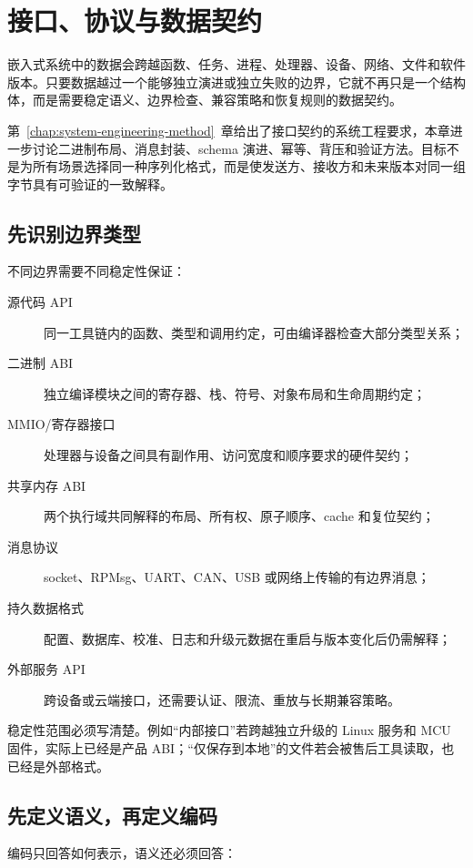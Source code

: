 \chapter{接口、协议与数据契约}
\label{chap:interface-protocol-data-contracts}

嵌入式系统中的数据会跨越函数、任务、进程、处理器、设备、网络、文件和软件版本。只要数据越过一个能够独立演进或独立失败的边界，它就不再只是一个结构体，而是需要稳定语义、边界检查、兼容策略和恢复规则的数据契约。

第~\ref{chap:system-engineering-method}~章给出了接口契约的系统工程要求，本章进一步讨论二进制布局、消息封装、schema 演进、幂等、背压和验证方法。目标不是为所有场景选择同一种序列化格式，而是使发送方、接收方和未来版本对同一组字节具有可验证的一致解释。

\section{先识别边界类型}

不同边界需要不同稳定性保证：

\begin{description}
  \item[源代码 API] 同一工具链内的函数、类型和调用约定，可由编译器检查大部分类型关系；
  \item[二进制 ABI] 独立编译模块之间的寄存器、栈、符号、对象布局和生命周期约定；
  \item[MMIO/寄存器接口] 处理器与设备之间具有副作用、访问宽度和顺序要求的硬件契约；
  \item[共享内存 ABI] 两个执行域共同解释的布局、所有权、原子顺序、cache 和复位契约；
  \item[消息协议] socket、RPMsg、UART、CAN、USB 或网络上传输的有边界消息；
  \item[持久数据格式] 配置、数据库、校准、日志和升级元数据在重启与版本变化后仍需解释；
  \item[外部服务 API] 跨设备或云端接口，还需要认证、限流、重放与长期兼容策略。
\end{description}

稳定性范围必须写清楚。例如“内部接口”若跨越独立升级的 Linux 服务和 MCU 固件，实际上已经是产品 ABI；“仅保存到本地”的文件若会被售后工具读取，也已经是外部格式。

\section{先定义语义，再定义编码}

编码只回答如何表示，语义还必须回答：

